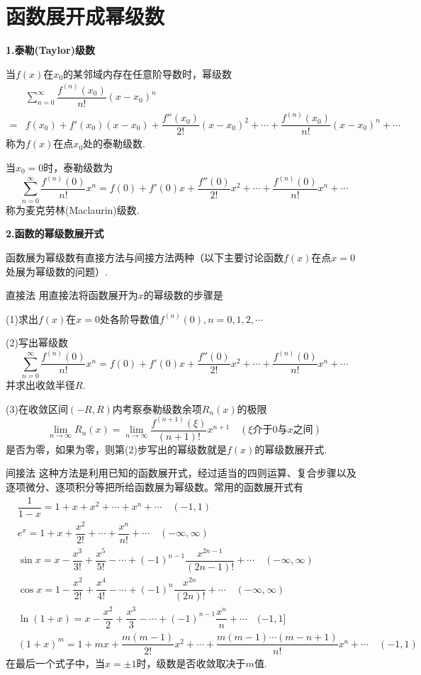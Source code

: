 \section{函数展开成幂级数}
\textbf{1.泰勒(Taylor)级数}

当$f(x)$在$x_0$的某邻域内存在任意阶导数时，幂级数
\begin{align*}
    & \sum_{n=0}^\infty \dfrac{f^{(n)}(x_0)}{n!}(x-x_0)^n \\
    = & f(x_0)+f'(x_0)(x-x_0)+\dfrac{f''(x_0)}{2!}(x-x_0)^2+\cdots+\dfrac{f^{(n)}(x_0)}{n!}(x-x_0)^n+\cdots
\end{align*}
称为$f(x)$在点$x_0$处的泰勒级数.

当$x_0=0$时，泰勒级数为
\begin{equation*}
    \sum_{n=0}^\infty \dfrac{f^{(n)}(0)}{n!}x^n=f(0)+f'(0)x+\dfrac{f''(0)}{2!}x^2+\cdots+\dfrac{f^{(n)}(0)}{n!}x^n+\cdots
\end{equation*}
称为麦克劳林(Maclaurin)级数.

\textbf{2.函数的幂级数展开式}

函数展为幂级数有直接方法与间接方法两种（以下主要讨论函数$f(x)$在点$x=0$处展为幂级数的问题）.

直接法 \quad 用直接法将函数展开为$x$的幂级数的步骤是

(1)求出$f(x)$在$x=0$处各阶导数值$f^{(n)}(0),n=0,1,2,\cdots
$

(2)写出幂级数
\begin{equation*}
    \sum_{n=0}^\infty \dfrac{f^{(n)}(0)}{n!}x^n=f(0)+f'(0)x+\dfrac{f''(0)}{2!}x^2+\cdots+\dfrac{f^{(n)}(0)}{n!}x^n+\cdots
\end{equation*}
并求出收敛半径$R$.

(3)在收敛区间$(-R,R)$内考察泰勒级数余项$R_n(x)$的极限
\begin{equation*}
    \lim_{n\rightarrow\infty}R_n(x)=\lim_{n\rightarrow\infty}\dfrac{f^{(n+1)}(\xi)}{(n+1)!}x^{n+1}\quad (\xi\mbox{介于}0\mbox{与}x\mbox{之间})
\end{equation*}
是否为零，如果为零，则第(2)步写出的幂级数就是$f(x)$的幂级数展开式.

间接法 \quad 这种方法是利用已知的函数展开式，经过适当的四则运算、复合步骤以及逐项微分、逐项积分等把所给函数展为幂级数。常用的函数展开式有
\begin{align*}
    & \dfrac{1}{1-x}=1+x+x^2+\cdots+x^n+\cdots \quad (-1,1) \\
    & e^x=1+x+\dfrac{x^2}{2!}+\cdots+\dfrac{x^n}{n!}+\cdots \quad (-\infty,\infty) \\
    & \sin x=x-\dfrac{x^3}{3!}+\dfrac{x^5}{5!}-\cdots+(-1)^{n-1}\dfrac{x^{2n-1}}{(2n-1)!}+\cdots \quad (-\infty,\infty) \\
    & \cos x=1-\dfrac{x^2}{2!}+\dfrac{x^4}{4!}-\cdots+(-1)^n\dfrac{x^{2n}}{(2n)!}+\cdots \quad (-\infty,\infty) \\
    & \ln (1+x)=x-\dfrac{x^2}{2}+\dfrac{x^3}{3}-\cdots+(-1)^{n-1}\dfrac{x^n}{n}+\cdots \quad (-1,1] \\
    & (1+x)^m=1+mx+\dfrac{m(m-1)}{2!}x^2+\cdots+\dfrac{m(m-1)\cdots(m-n+1)}{n!}x^n+\cdots \quad (-1,1)
\end{align*}
在最后一个式子中，当$x=\pm 1$时，级数是否收敛取决于$m$值.

